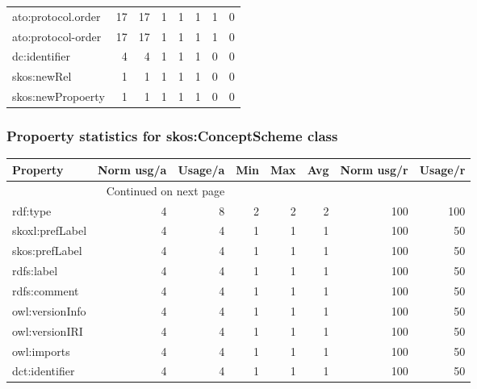 \documentclass[10pt,a4paper,titlepage,final]{article}
\begin{document}
\begin{longtable}{lrrrrrrr}
     ato:protocol.order &          17 &       17 &    1 &    1 &    1 &           1 &        0 \\
     ato:protocol-order &          17 &       17 &    1 &    1 &    1 &           1 &        0 \\
          dc:identifier &           4 &        4 &    1 &    1 &    1 &           0 &        0 \\
            skos:newRel &           1 &        1 &    1 &    1 &    1 &           0 &        0 \\
      skos:newPropoerty &           1 &        1 &    1 &    1 &    1 &           0 &        0 \\
\end{longtable}


\subsubsection{Propoerty statistics for skos:ConceptScheme class}
\begin{longtable}{lrrrrrrr}
\toprule
        Property &  Norm usg/a &  Usage/a &  Min &  Max &  Avg &  Norm usg/r &  Usage/r \\
\midrule
\endhead
\midrule
\multicolumn{3}{r}{{Continued on next page}} \\
\midrule
\endfoot

\bottomrule
\endlastfoot
        rdf:type &           4 &        8 &    2 &    2 &    2 &         100 &      100 \\
 skoxl:prefLabel &           4 &        4 &    1 &    1 &    1 &         100 &       50 \\
  skos:prefLabel &           4 &        4 &    1 &    1 &    1 &         100 &       50 \\
      rdfs:label &           4 &        4 &    1 &    1 &    1 &         100 &       50 \\
    rdfs:comment &           4 &        4 &    1 &    1 &    1 &         100 &       50 \\
 owl:versionInfo &           4 &        4 &    1 &    1 &    1 &         100 &       50 \\
  owl:versionIRI &           4 &        4 &    1 &    1 &    1 &         100 &       50 \\
     owl:imports &           4 &        4 &    1 &    1 &    1 &         100 &       50 \\
  dct:identifier &           4 &        4 &    1 &    1 &    1 &         100 &       50 \\
\end{longtable}
\end{document}

